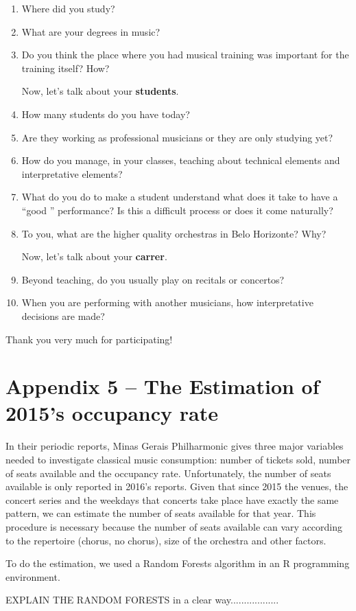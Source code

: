 \documentclass[a4paper, 12pt, openright, oneside, german, french, brazil, english]{abntex2}
\begin{document}
        \begin{enumerate}
        \item Where did you study?
        \item What are your degrees in music?
        \item Do you think the place where you had musical training was important for the training itself? How?

          \vspace{1cm}
        Now, let's talk about your \textbf{students}.
        \item How many students do you have today?
        \item Are they working as professional musicians or they are only studying yet?
        \item How do you manage, in your classes, teaching about technical elements and interpretative elements?
        \item What do you do to make a student understand what does it take to have a ``good '' performance? Is this a difficult process or does it come naturally?
        \item To you, what are the higher quality orchestras in Belo Horizonte? Why?

          \vspace{1cm}
          Now, let's talk about your \textbf{carrer}.
        \item Beyond teaching, do you usually play on recitals or concertos?
        \item When you are performing with another musicians, how interpretative decisions are made?
        \end{enumerate}

        Thank you very much for participating!




        \chapter*[Random Forests]{Appendix 5 -- The Estimation of 2015's occupancy rate}

        In their periodic reports, Minas Gerais Philharmonic gives three major variables needed to investigate classical music consumption: number of tickets sold, number of seats available and the occupancy rate. Unfortunately, the number of seats available is only reported in 2016's reports. Given that since 2015 the venues, the concert series and the weekdays that concerts take place have exactly the same pattern, we can estimate the number of seats available for that year. This procedure is necessary because the number of seats available can vary according to the repertoire (chorus, no chorus), size of the orchestra and other factors.

        To do the estimation, we used a Random Forests algorithm in an R programming environment.

        EXPLAIN THE RANDOM FORESTS in a clear way..................

        
\end{document}
